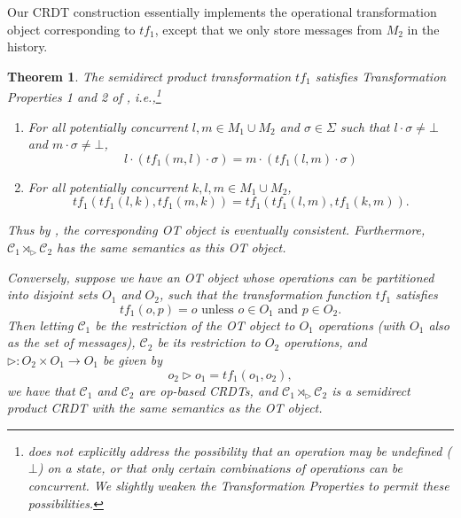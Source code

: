 \documentclass[acmsmall,nonacm]{acmart}
\newcommand{\mc}[1]{\ensuremath{\mathcal{#1}}}
\newcommand{\ra}{\rightarrow}
\newcommand{\act}{\triangleright}
\theoremstyle{plain}
\newtheorem{mythm}{Theorem}[section]
\theoremstyle{definition}
\begin{document}
Our CRDT construction essentially implements the operational transformation object corresponding to $tf_1$, except that we only store messages from $M_2$ in the history.
\begin{mythm}
\label{thm:ot}
The semidirect product transformation $tf_1$ satisfies Transformation Properties 1 and 2 of \cite{ot_ressel}, i.e.,\footnote{\cite{ot_ressel} does not explicitly address the possibility that an operation may be undefined ($\bot$) on a state, or that only certain combinations of operations can be concurrent.  We slightly weaken the Transformation Properties to permit these possibilities.}
\begin{enumerate}[1.]
  \item For all potentially concurrent $l, m \in M_1 \cup M_2$ and $\sigma \in \Sigma$ such that $l \cdot \sigma \neq \bot$ and $m \cdot \sigma \neq \bot$, $$l \cdot (tf_1(m, l) \cdot \sigma) = m \cdot (tf_1(l, m) \cdot \sigma)$$
  \item For all potentially concurrent $k, l, m \in M_1 \cup M_2$, $$tf_1(tf_1(l, k), tf_1(m, k)) = tf_1(tf_1(l, m), tf_1(k, m)).$$
\end{enumerate}
Thus by \cite[Theorem 1]{ot_ressel}, the corresponding OT object is eventually consistent.  Furthermore, $\mc{C}_1 \rtimes_\act \mc{C}_2$ has the same semantics as this OT object.

Conversely, suppose we have an OT object whose operations can be partitioned into disjoint sets $O_1$ and $O_2$, such that the transformation function $tf_1$ satisfies $$\mbox{$tf_1(o, p) = o$ unless $o \in O_1$ and $p \in O_2$.}$$  Then letting $\mc{C}_1$ be the restriction of the OT object to $O_1$ operations (with $O_1$ also as the set of messages), $\mc{C}_2$ be its restriction to $O_2$ operations, and $\act: O_2 \times O_1 \ra O_1$ be given by
\[
o_2 \act o_1 = tf_1(o_1, o_2),
\]
we have that $\mc{C}_1$ and $\mc{C}_2$ are op-based CRDTs, and $\mc{C}_1 \rtimes_\act \mc{C}_2$ is a semidirect product CRDT with the same semantics as the OT object.
\end{mythm}
\end{document}
